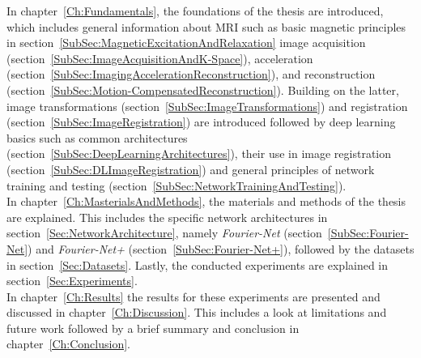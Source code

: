 In chapter~\ref{Ch:Fundamentals}, the foundations of the thesis are introduced, which includes general information about MRI such as basic magnetic principles in section~\ref{SubSec:MagneticExcitationAndRelaxation} image acquisition (section~\ref{SubSec:ImageAcquisitionAndK-Space}), acceleration (section~\ref{SubSec:ImagingAccelerationReconstruction}), and reconstruction (section~\ref{SubSec:Motion-CompensatedReconstruction}). Building on the latter, image transformations (section~\ref{SubSec:ImageTransformations}) and registration (section~\ref{SubSec:ImageRegistration}) are introduced followed by deep learning basics such as common architectures (section~\ref{SubSec:DeepLearningArchitectures}), their use in image registration (section~\ref{SubSec:DLImageRegistration}) and general principles of network training and testing (section~\ref{SubSec:NetworkTrainingAndTesting}).\\
In chapter~\ref{Ch:MasterialsAndMethods}, the materials and methods of the thesis are explained. This includes the specific network architectures in section~\ref{Sec:NetworkArchitecture}, namely \emph{Fourier-Net} (section~\ref{SubSec:Fourier-Net}) and \emph{Fourier-Net+} (section~\ref{SubSec:Fourier-Net+}), followed by the datasets in section~\ref{Sec:Datasets}.
Lastly, the conducted experiments are explained in section~\ref{Sec:Experiments}.\\
In chapter~\ref{Ch:Results} the results for these experiments are presented and discussed in chapter~\ref{Ch:Discussion}. This includes a look at limitations and future work followed by a brief summary and conclusion in chapter~\ref{Ch:Conclusion}.
